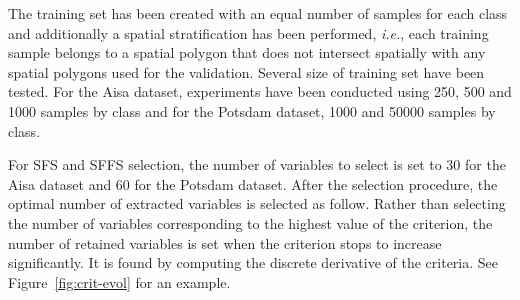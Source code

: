 \documentclass[journal,peerreview,onecolumn]{IEEEtran}
\begin{document}
    The training set has been created  with an equal number of samples
    for each class and additionally  a spatial stratification has been
    performed, \emph{i.e.}, each training  sample belongs to a spatial
    polygon  that  does  not  intersect  spatially  with  any  spatial
    polygons used  for the validation.   Several size of  training set
    have been  tested.  For  the Aisa  dataset, experiments  have been
    conducted using  250, 500 and  1000 samples  by class and  for the
    Potsdam dataset, 1000 and 50000 samples by class.

    For SFS and  SFFS selection, the number of variables  to select is
    set to  30 for the  Aisa dataset and  60 for the  Potsdam dataset.
    After  the selection  procedure, the  optimal number  of extracted
    variables is selected as follow.  Rather than selecting the number
    of variables corresponding to the  highest value of the criterion,
    the number of  retained variables is set when  the criterion stops
    to increase significantly.  It is  found by computing the discrete
    derivative of the criteria.  See Figure~\ref{fig:crit-evol} for an
    example.
\end{document}
